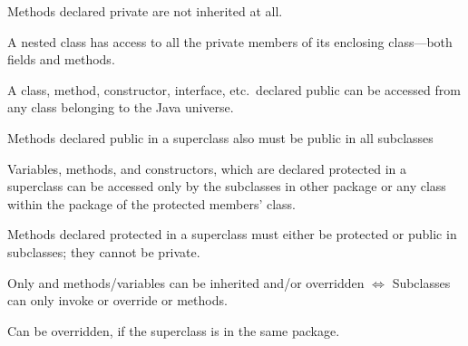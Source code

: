 \begin{consequencebox}[Consequence]\nospacing
  Methods declared private are not inherited at all.
\end{consequencebox}

\begin{notebox}\nospacing
  A nested class has access to all the private members of its enclosing class—both fields and methods.
\end{notebox}
\begin{defnbox}\nospacing
  \begin{defn}[Public]\label{defn:private}
    A class, method, constructor, interface, etc.\ declared public can be
    accessed from any class belonging to the Java universe.
  \end{defn}
\end{defnbox}
\begin{consequencebox}[Consequence]\nospacing
  \begin{itemizenosep}
      \item Methods declared public in a superclass also must be public in all subclasses
  \end{itemizenosep}
\end{consequencebox}
\begin{defnbox}\nospacing
  \begin{defn}[Protected]\label{defn:protected}
    Variables, methods, and constructors, which are declared protected in a superclass can be accessed only by the subclasses in other package or any class within the package of the protected members' class.
  \end{defn}
\end{defnbox}
\begin{consequencebox}[Consequence]\nospacing
  \begin{itemizenosep}
    \item
Methods declared protected in a superclass must either be protected or public in
subclasses; they cannot be private.
\end{itemizenosep}
\end{consequencebox}
\begin{consequencebox}[Consequence]\nospacing
    Only  and  methods/variables can
    be inherited and/or overridden $\iff$
    Subclasses can only invoke or override  or  methods.
\end{consequencebox}
\begin{notebox}\nospacing
  Can be overridden, if the superclass is in the same package.
\end{notebox}
